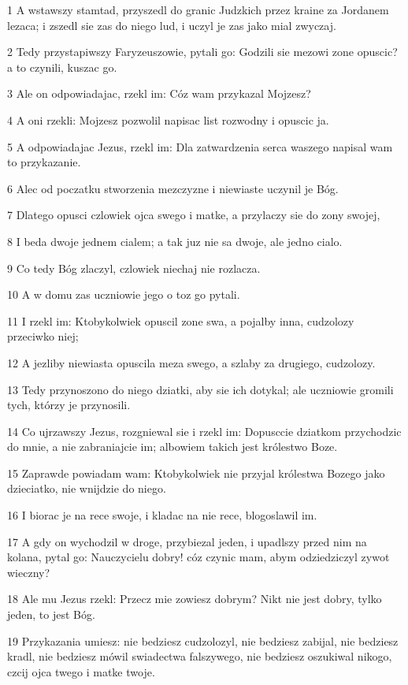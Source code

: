 \par 1 A wstawszy stamtad, przyszedl do granic Judzkich przez kraine za Jordanem lezaca; i zszedl sie zas do niego lud, i uczyl je zas jako mial zwyczaj.
\par 2 Tedy przystapiwszy Faryzeuszowie, pytali go: Godzili sie mezowi zone opuscic? a to czynili, kuszac go.
\par 3 Ale on odpowiadajac, rzekl im: Cóz wam przykazal Mojzesz?
\par 4 A oni rzekli: Mojzesz pozwolil napisac list rozwodny i opuscic ja.
\par 5 A odpowiadajac Jezus, rzekl im: Dla zatwardzenia serca waszego napisal wam to przykazanie.
\par 6 Alec od poczatku stworzenia mezczyzne i niewiaste uczynil je Bóg.
\par 7 Dlatego opusci czlowiek ojca swego i matke, a przylaczy sie do zony swojej,
\par 8 I beda dwoje jednem cialem; a tak juz nie sa dwoje, ale jedno cialo.
\par 9 Co tedy Bóg zlaczyl, czlowiek niechaj nie rozlacza.
\par 10 A w domu zas uczniowie jego o toz go pytali.
\par 11 I rzekl im: Ktobykolwiek opuscil zone swa, a pojalby inna, cudzolozy przeciwko niej;
\par 12 A jezliby niewiasta opuscila meza swego, a szlaby za drugiego, cudzolozy.
\par 13 Tedy przynoszono do niego dziatki, aby sie ich dotykal; ale uczniowie gromili tych, którzy je przynosili.
\par 14 Co ujrzawszy Jezus, rozgniewal sie i rzekl im: Dopusccie dziatkom przychodzic do mnie, a nie zabraniajcie im; albowiem takich jest królestwo Boze.
\par 15 Zaprawde powiadam wam: Ktobykolwiek nie przyjal królestwa Bozego jako dzieciatko, nie wnijdzie do niego.
\par 16 I biorac je na rece swoje, i kladac na nie rece, blogoslawil im.
\par 17 A gdy on wychodzil w droge, przybiezal jeden, i upadlszy przed nim na kolana, pytal go: Nauczycielu dobry! cóz czynic mam, abym odziedziczyl zywot wieczny?
\par 18 Ale mu Jezus rzekl: Przecz mie zowiesz dobrym? Nikt nie jest dobry, tylko jeden, to jest Bóg.
\par 19 Przykazania umiesz: nie bedziesz cudzolozyl, nie bedziesz zabijal, nie bedziesz kradl, nie bedziesz mówil swiadectwa falszywego, nie bedziesz oszukiwal nikogo, czcij ojca twego i matke twoje.
